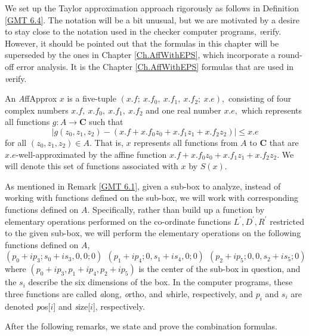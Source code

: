 \begin{remark} \label{GMT 6.3}
We set up the Taylor approximation approach rigorously
as follows in Definition \ref{GMT 6.4}.
The notation will be a bit unusual, but we are motivated by a desire to stay close to the notation used in the checker computer programs, {\textit verify}.  However, it should be pointed out that the formulas in this
	chapter will be superseded by the ones in Chapter \ref{Ch.AffWithEPS}, which incorporate a round-off error analysis.  It is the Chapter \ref{Ch.AffWithEPS} formulas that are
used in {\textit verify}.\end{remark}

\begin{definition} \label{GMT 6.4} An {\textit AffApprox}  $x$ is a five-tuple
$(x.f;\ x.f_0,\ x.f_1,\ x.f_2;\ x.e),$
consisting of four complex numbers $x.f,\ x.f_0,\ x.f_1,\ x.f_2$ and one real number $x.e,$  which represents all functions 
$g: A \rightarrow {\mathbf C}$ such that
$$|g(z_0,z_1,z_2) - (x.f + x.f_0 z_0 + x.f_1 z_1 + x.f _2 z_2)| \le x.e$$
for all $(z_0,z_1,z_2) \in A.$  That is, $x$ represents all functions from $A$ to ${\mathbf C}$ that are $x.e$-well-approximated by the affine function $x.f + x.f_0 z_0 + x.f_1 z_1 + x.f _2 z_2$.  We will denote this set of functions associated with $x$ by $S(x)$.\end{definition}

\begin{remark}\label{GMT 6.5}
As mentioned in Remark \ref{GMT 6.1}, given a sub-box to analyze, instead of working with functions defined on the sub-box, we will work with corresponding functions defined on $A.$  Specifically, rather than build up a function by elementary operations performed on the co-ordinate functions 
$L^{\prime}, D^{\prime}, R^{\prime}$ 
restricted to the given sub-box, we will perform the elementary operations on the following functions defined on $A$, 
$$(p_0 + i p_3; s_0 + i s_3,0,0; 0)\  \ (p_1 + i p_4; 0, s_1 + i s_4,0;0) \   \ (p_2 + i p_5; 0,0, s_2 + i s_5; 0)$$
where $(p_0 + i p_3, p_1 + i p_4, p_2 + i p_5)$ is the center of the sub-box in question, and the $s_i$ describe the six dimensions of the box. In the computer programs, these three functions are called {\textit along}, {\textit ortho}, and {\textit whirle,} respectively, and $p_i$ and $s_i$
 are denoted {\textit pos}[$i$] and {\textit size}[$i$], respectively.\end{remark}

After the following remarks, we state and prove the combination formulas. 

